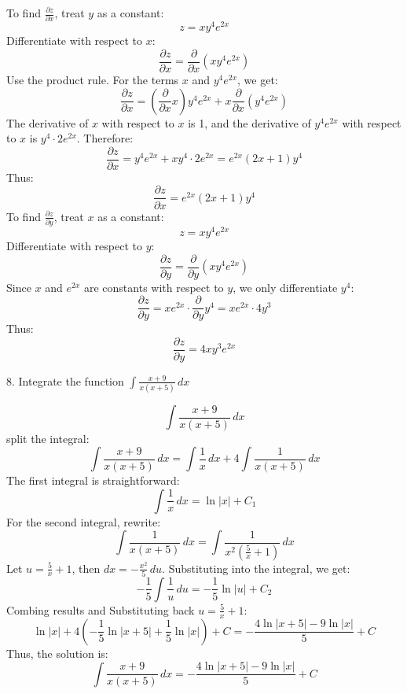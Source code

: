 \documentclass[a4paper, 12pt]{report}
\def\ni{green!60!black!40!white}
\begin{document}
    To find \( \frac{\partial z}{\partial x} \), treat \( y \) as a constant:
    \[z = x y^4 e^{2x}\]
    Differentiate with respect to \( x \):
    \[\frac{\partial z}{\partial x} = \frac{\partial}{\partial x} \left( x y^4 e^{2x} \right)\]
    Use the product rule. For the terms \( x \) and \( y^4 e^{2x} \), we get:
    \[\frac{\partial z}{\partial x} = \left( \frac{\partial}{\partial x} x \right) y^4 e^{2x} + x \frac{\partial}{\partial x} \left( y^4 e^{2x} \right)\]
    The derivative of \( x \) with respect to \( x \) is 1, and the derivative of \( y^4 e^{2x} \) with respect to \( x \) is \( y^4 \cdot 2e^{2x} \). Therefore:
    \[\frac{\partial z}{\partial x} = y^4 e^{2x} + x y^4 \cdot 2e^{2x} = e^{2x}(2x + 1) y^4\]
    Thus:
    \[\boxed{\frac{\partial z}{\partial x} = e^{2x} (2x + 1) y^4}\]
    To find \( \frac{\partial z}{\partial y} \), treat \( x \) as a constant:
    \[z = x y^4 e^{2x}\]
    Differentiate with respect to \( y \):
    \[\frac{\partial z}{\partial y} = \frac{\partial}{\partial y} \left( x y^4 e^{2x} \right)\]
    Since \( x \) and \( e^{2x} \) are constants with respect to \( y \), we only differentiate \( y^4 \):
    \[\frac{\partial z}{\partial y} = x e^{2x} \cdot \frac{\partial}{\partial y} y^4 = x e^{2x} \cdot 4y^3\]
    Thus:
    \[\boxed{\frac{\partial z}{\partial y} = 4x y^3 e^{2x}}\]
    
    \newpage
    
    \begin{tcolorbox}[title={\color{black}\section{Q8}}, colback=white, colframe=\ni, boxrule=1mm, width=1\textwidth]
        8. Integrate the function \( \int \frac{x + 9}{x(x + 5)} \, dx \)
    \end{tcolorbox}
    
    \[\int \frac{x + 9}{x(x + 5)} \, dx\]
    split the integral:
    \[\int \frac{x + 9}{x(x + 5)} \, dx = \int \frac{1}{x} \, dx + 4 \int \frac{1}{x(x + 5)} \, dx\]
    The first integral is straightforward:
    \[\int \frac{1}{x} \, dx = \ln|x| + C_1\]
    For the second integral, rewrite:
    \[\int \frac{1}{x(x + 5)} \, dx = \int \frac{1}{x^2 \left( \frac{5}{x} + 1 \right)} \, dx\]
    Let \( u = \frac{5}{x} + 1 \), then \( dx = -\frac{x^2}{5} \, du \).
    Substituting into the integral, we get:
    \[-\frac{1}{5} \int \frac{1}{u} \, du = -\frac{1}{5} \ln|u| + C_2\]
    Combing results and Substituting back \( u = \frac{5}{x} + 1 \):
    \[\ln|x| + 4 \left( -\frac{1}{5} \ln|x + 5| + \frac{1}{5} \ln|x| \right) + C = -\frac{4 \ln\left|x + 5\right| - 9 \ln\left|x\right|}{5} + C\]
    Thus, the solution is:
    \[\boxed{\int \frac{x + 9}{x(x + 5)} \, dx =  -\frac{4 \ln\left|x + 5\right| - 9 \ln\left|x\right|}{5} + C}\]
    
\end{document}
